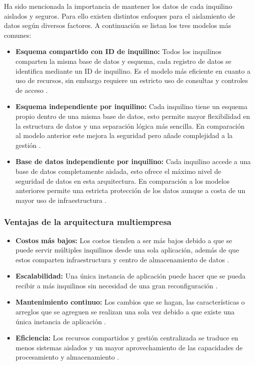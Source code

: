 Ha sido mencionada la importancia de mantener los datos de cada inquilino aislados y seguros. Para ello existen distintos enfoques para el aislamiento de datos según diversos factores. A continuación se listan los tres modelos más comunes:

\begin{itemize}
    \item \textbf{Esquema compartido con ID de inquilino:} Todos los inquilinos comparten la misma base de datos y esquema, cada registro de datos se identifica mediante un ID de inquilino. Es el modelo más eficiente en cuanto a uso de recursos, sin embargo requiere un estricto uso de consultas y controles de acceso \cite{futureprocessing2025multitenant}.
    \item \textbf{Esquema independiente por inquilino:} Cada inquilino tiene un esquema propio dentro de una misma base de datos, esto permite mayor flexibilidad en la estructura de datos y una separación lógica más sencilla. En comparación al modelo anterior este mejora la seguridad pero añade complejidad a la gestión \cite{futureprocessing2025multitenant}.
    \item \textbf{Base de datos independiente por inquilino:} Cada inquilino accede a una base de datos completamente aislada, esto ofrece el máximo nivel de seguridad de datos en esta arquitectura. En comparación a los modelos anteriores permite una estricta protección de los datos aunque a costa de un mayor uso de infraestructura \cite{futureprocessing2025multitenant}.
\end{itemize}

\subsubsection{Ventajas de la arquitectura multiempresa}
\label{subsec:ventajas_multitenant}

\begin{itemize}
    \item \textbf{Costos más bajos:} Los costos tienden a ser más bajos debido a que se puede servir múltiples inquilinos desde una sola aplicación, además de que estos comparten infraestructura y centro de almacenamiento de datos \cite{ibm2021multitenant, futureprocessing2025multitenant}.
    \item \textbf{Escalabilidad:} Una única instancia de aplicación puede hacer que se pueda recibir a más inquilinos sin necesidad de una gran reconfiguración \cite{futureprocessing2025multitenant}.
    \item \textbf{Mantenimiento continuo:} Los cambios que se hagan, las características o arreglos que se agreguen se realizan una sola vez debido a que existe una única instancia de aplicación \cite{ibm2021multitenant,futureprocessing2025multitenant}.
    \item \textbf{Eficiencia:} Los recursos compartidos y gestión centralizada se traduce en menos sistemas aislados y un mayor aprovechamiento de las capacidades de procesamiento y almacenamiento \cite{futureprocessing2025multitenant}.
\end{itemize}

